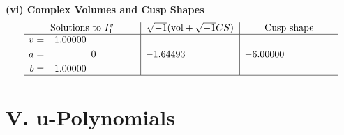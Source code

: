 \documentclass[1p]{elsarticle_modified}
\theoremstyle{definition}
\newcommand{\I}{\sqrt{-1}}
\begin{document}
\newpage\flushleft \textbf{(vi) Complex Volumes and Cusp Shapes}
$$\begin{array}{c|c|c}  
\text{Solutions to }I^v_{1}& \I (\text{vol} + \sqrt{-1}CS) & \text{Cusp shape}\\
 \hline 
\begin{aligned}
v &= \phantom{-}1.00000\phantom{ +0.000000I} \\
a &= \phantom{-0.000000 } 0 \\
b &= \phantom{-}1.00000\phantom{ +0.000000I}\end{aligned}
 & -1.64493\phantom{ +0.000000I} & -6.00000\phantom{ +0.000000I}\\
 \hline 
 \end{array}$$\newpage
\newpage\renewcommand{\arraystretch}{1}
\centering \section*{ V. u-Polynomials}
\end{document}
